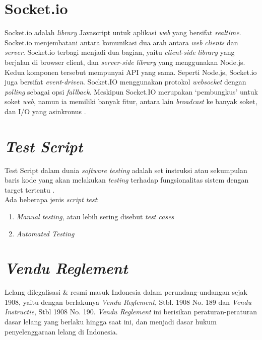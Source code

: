 	\section{  Socket.io}
	Socket.io adalah \textit{library} Javascript untuk aplikasi \textit{web} yang bersifat \textit{realtime}. Socket.io menjembatani antara komunikasi dua arah antara \textit{web} \textit{clients} dan \textit{server}. Socket.io terbagi menjadi dua bagian, yaitu \textit{client}-\textit{side} \textit{library} yang berjalan di browser client, dan \textit{server}-\textit{side} \textit{library} yang menggunakan Node.js. Kedua komponen tersebut mempunyai API yang sama. Seperti Node.js, Socket.io juga bersifat \textit{event}-\textit{driven}. Socket.IO menggunakan protokol \textit{websocket} dengan \textit{polling} sebagai opsi \textit{fallback}. Meskipun Socket.IO merupakan ‘pembungkus’ untuk soket \textit{web}, namun ia memiliki banyak fitur, antara lain \textit{broadcast} ke banyak soket, dan I/O yang asinkronus \cite{noauthor_socket.io_2016}.
	
	\section{  \textit{Test Script}}
	Test Script dalam dunia \textit{software testing} adalah set instruksi atau sekumpulan baris kode yang akan melakukan \textit{testing} terhadap fungsionalitas sistem dengan target tertentu \cite{noauthor_test_2016}.
	\\ \indent Ada beberapa jenis \textit{script test}:
	\begin{enumerate}
	  	\item \textit{Manual testing}, atau lebih sering disebut \textit{test cases}
	  	\item \textit{Automated Testing}
	\end{enumerate}
	
	\section{  \textit{Vendu Reglement}}
	Lelang dilegalisasi \& resmi masuk Indonesia dalam perundang-undangan sejak 1908, yaitu dengan berlakunya \textit{Vendu Reglement}, Stbl. 1908 No. 189 dan \textit{Vendu Instructie}, Stbl 1908 No. 190. \textit{Vendu Reglement} ini berisikan peraturan-peraturan dasar lelang yang berlaku hingga saat ini, dan menjadi dasar hukum penyelenggaraan lelang di Indonesia\cite{balailelang_sejarah_nodate}.
	
